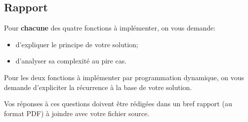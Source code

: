 \documentclass[a4paper,10pt]{article}
\begin{document}
\subsection*{Rapport}


Pour \textbf{chacune} des quatre fonctions à implémenter, on vous demande:
\begin{itemize}
\item d'expliquer le principe de votre solution;
\item d'analyser sa complexité au pire cas.
\end{itemize}

Pour les deux fonctions à implémenter par programmation
dynamique, on vous demande d'expliciter la récurrence à la
base de votre solution.

Vos réponses à ces questions doivent être rédigées dans un bref rapport (au format
PDF) à joindre avec votre fichier source.
\end{document}
